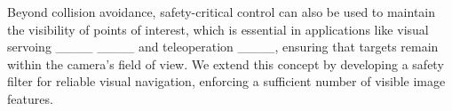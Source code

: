 Beyond collision avoidance, safety-critical control can also be used to maintain the visibility of points of interest, which is essential in applications like visual servoing ____ ____ and teleoperation ____, ensuring that targets remain within the camera's field of view. We extend this concept by developing a safety filter for reliable visual navigation, enforcing a sufficient number of visible image features.





%
